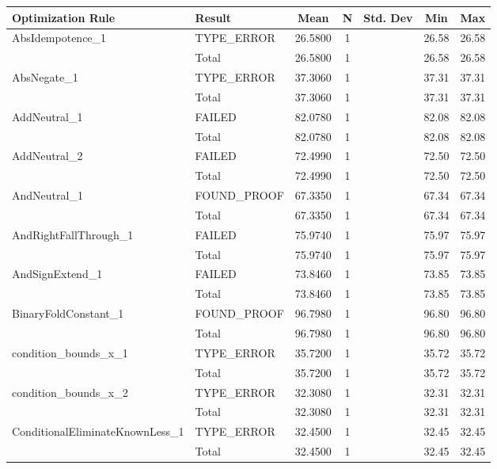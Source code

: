 \begin{appendices}
\begin{longtable}{L{0.25\textwidth} L{0.2\textwidth}  c  c  c  c  c } 
    \toprule
    Optimization Rule & Result & Mean & N & Std. Dev & Min & Max \\ \midrule 
    AbsIdempotence\_1 & TYPE\_ERROR & 26.5800 & 1 &  & 26.58 & 26.58 \\ \midrule 
    & Total & 26.5800 & 1 &  & 26.58 & 26.58 \\ \midrule 
    AbsNegate\_1 & TYPE\_ERROR & 37.3060 & 1 &  & 37.31 & 37.31 \\ \midrule 
    & Total & 37.3060 & 1 &  & 37.31 & 37.31 \\ \midrule 
    AddNeutral\_1 & FAILED & 82.0780 & 1 &  & 82.08 & 82.08 \\ \midrule 
    & Total & 82.0780 & 1 &  & 82.08 & 82.08 \\ \midrule 
    AddNeutral\_2 & FAILED & 72.4990 & 1 &  & 72.50 & 72.50 \\ \midrule 
    & Total & 72.4990 & 1 &  & 72.50 & 72.50 \\ \midrule 
    AndNeutral\_1 & FOUND\_PROOF & 67.3350 & 1 &  & 67.34 & 67.34 \\ \midrule 
    & Total & 67.3350 & 1 &  & 67.34 & 67.34 \\ \midrule 
    AndRightFallThrough\_1 & FAILED & 75.9740 & 1 &  & 75.97 & 75.97 \\ \midrule 
    & Total & 75.9740 & 1 &  & 75.97 & 75.97 \\ \midrule 
    AndSignExtend\_1 & FAILED & 73.8460 & 1 &  & 73.85 & 73.85 \\ \midrule 
    & Total & 73.8460 & 1 &  & 73.85 & 73.85 \\ \midrule 
    BinaryFoldConstant\_1 & FOUND\_PROOF & 96.7980 & 1 &  & 96.80 & 96.80 \\ \midrule 
    & Total & 96.7980 & 1 &  & 96.80 & 96.80 \\ \midrule 
    condition\_bounds\_x\_1 & TYPE\_ERROR & 35.7200 & 1 &  & 35.72 & 35.72 \\ \midrule 
    & Total & 35.7200 & 1 &  & 35.72 & 35.72 \\ \midrule 
    condition\_bounds\_x\_2 & TYPE\_ERROR & 32.3080 & 1 &  & 32.31 & 32.31 \\ \midrule 
    & Total & 32.3080 & 1 &  & 32.31 & 32.31 \\ \midrule 
    ConditionalEliminateKnownLess\_1 & TYPE\_ERROR & 32.4500 & 1 &  & 32.45 & 32.45 \\ \midrule 
    & Total & 32.4500 & 1 &  & 32.45 & 32.45 \\ \midrule 

\end{longtable}
\end{appendices}
